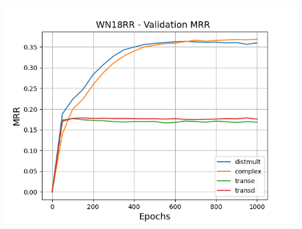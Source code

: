 \begin{figure}
\begin{minipage}{.3\textwidth}
    \end{minipage}
    \begin{minipage}{.3\textwidth}
      \centering
      \includegraphics[width=\linewidth]{figures/results/pretrain/wn18rr/pretrain_wn18rr_mrrs.png}
    \end{minipage}%
    

\end{figure}

